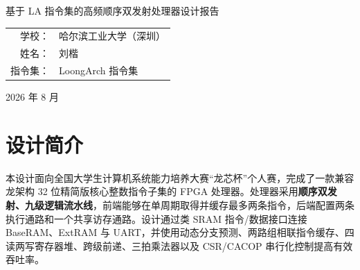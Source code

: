 \documentclass[UTF8,a4paper,zihao=5,fontset=none]{ctexart}
\newcommand{\songti}{\CJKfamily{rm}}
\newcommand{\heiti}{\CJKfamily{sf}}
\newcommand{\ReportTitle}{基于 LA 指令集的高频顺序双发射处理器设计报告}
\newcommand{\SchoolName}{哈尔滨工业大学（深圳）}
\newcommand{\StudentName}{刘楷}
\newcommand{\ReportDate}{2026 年 8 月}
\renewcommand{\arraystretch}{1.25}
\begin{document}
\songti

\begin{titlepage}
  \thispagestyle{empty}
  \centering
  \vspace*{2.0cm}
  {\heiti{}\ReportTitle\par}
  \vspace{3.0cm}
  \renewcommand{\arraystretch}{1.8}
  \begin{tabular}{>{\heiti}r l}
    学校：  & \SchoolName   \\
    姓名：  & \StudentName  \\
    指令集： & LoongArch 指令集 \\
  \end{tabular}
  \vfill
  {\ReportDate\par}
\end{titlepage}

\tableofcontents
\clearpage
{}

\section{设计简介}

本设计面向全国大学生计算机系统能力培养大赛“龙芯杯”个人赛，完成了一款兼容龙架构 32 位精简版核心整数指令子集的 FPGA 处理器。处理器采用\textbf{顺序双发射、九级逻辑流水线}，前端能够在单周期取得并缓存最多两条指令，后端配置两条执行通路和一个共享访存通路。设计通过类 SRAM 指令/数据接口连接 BaseRAM、ExtRAM 与 UART，并使用动态分支预测、两路组相联指令缓存、四读两写寄存器堆、跨级前递、三拍乘法器以及 CSR/CACOP 串行化控制提高有效吞吐率。
\end{document}
